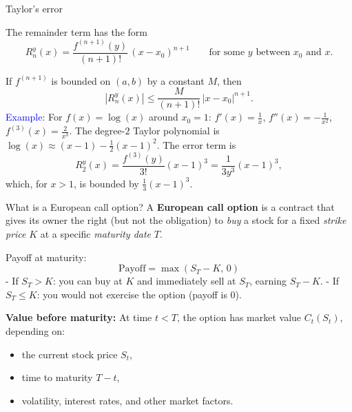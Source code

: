 \documentclass[11pt,aspectratio=169]{beamer}
\begin{document}
\begin{frame}{Taylor's error}
\begin{alertblock}{The remainder term has the form}
\[
R^y_n(x) = \frac{f^{(n+1)}(y)}{(n+1)!}\,(x-x_0)^{n+1}\qquad\mbox{for some }y \mbox{ between $x_0$ and $x$}.
\]
\end{alertblock}
\medskip
If $f^{(n+1)}$ is bounded on $(a,b)$ by a constant $M$, then
\[
|R^y_n(x)| \le \frac{M}{(n+1)!}\,|x-x_0|^{n+1}.
\]
\textcolor{blue}{Example:} For $f(x)=\log(x)$ around $x_0=1$: $
f'(x)=\frac1x$, $f''(x)=-\frac1{x^2}$, $f^{(3)}(x)=\frac{2}{x^3}$.
The degree-$2$ Taylor polynomial is $\log(x) \approx (x-1) - \frac12 (x-1)^2$.
The error term is
\[
R^y_2(x) = \frac{f^{(3)}(y)}{3!}(x-1)^3 = \frac{1}{3y^3}(x-1)^3,
\]
which, for $x>1$, is bounded by $\frac13(x-1)^3$.
\end{frame}

\begin{frame}{What is a European call option?}
\small
A \textbf{European call option} is a contract that gives its owner the right (but not the obligation) 
to \emph{buy} a stock for a fixed \emph{strike price} $K$ at a specific \emph{maturity date} $T$.

\medskip
Payoff at maturity:
\[
\text{Payoff} = \max(S_T - K,\, 0)
\]
- If $S_T > K$: you can buy at $K$ and immediately sell at $S_T$, earning $S_T - K$.
- If $S_T \le K$: you would not exercise the option (payoff is 0).

\medskip
\textbf{Value before maturity:} At time $t<T$, the option has market value $C_t(S_t)$,  
depending on:
\begin{itemize}
\item the current stock price $S_t$,
\item time to maturity $T-t$,
\item volatility, interest rates, and other market factors.
\end{itemize}
%
\end{frame}
\end{document}
